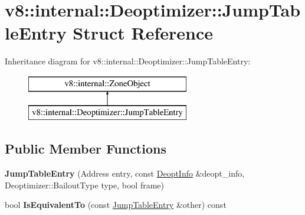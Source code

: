 \hypertarget{structv8_1_1internal_1_1_deoptimizer_1_1_jump_table_entry}{}\section{v8\+:\+:internal\+:\+:Deoptimizer\+:\+:Jump\+Table\+Entry Struct Reference}
\label{structv8_1_1internal_1_1_deoptimizer_1_1_jump_table_entry}
Inheritance diagram for v8\+:\+:internal\+:\+:Deoptimizer\+:\+:Jump\+Table\+Entry\+:\begin{figure}[H]
\begin{center}
\leavevmode
\includegraphics[height=2.000000cm]{structv8_1_1internal_1_1_deoptimizer_1_1_jump_table_entry}
\end{center}
\end{figure}
\subsection*{Public Member Functions}
\begin{DoxyCompactItemize}
\item 
{\bfseries Jump\+Table\+Entry} (Address entry, const \hyperlink{structv8_1_1internal_1_1_deoptimizer_1_1_deopt_info}{Deopt\+Info} \&deopt\+\_\+info, Deoptimizer\+::\+Bailout\+Type type, bool frame)\hypertarget{structv8_1_1internal_1_1_deoptimizer_1_1_jump_table_entry_af6b224af2fbdc97337cd4f75ec442094}{}\label{structv8_1_1internal_1_1_deoptimizer_1_1_jump_table_entry_af6b224af2fbdc97337cd4f75ec442094}

\item 
bool {\bfseries Is\+Equivalent\+To} (const \hyperlink{structv8_1_1internal_1_1_deoptimizer_1_1_jump_table_entry}{Jump\+Table\+Entry} \&other) const \hypertarget{structv8_1_1internal_1_1_deoptimizer_1_1_jump_table_entry_a4ce13acab78eb9e4064a2e78a15b2034}{}\label{structv8_1_1internal_1_1_deoptimizer_1_1_jump_table_entry_a4ce13acab78eb9e4064a2e78a15b2034}

\end{DoxyCompactItemize}
